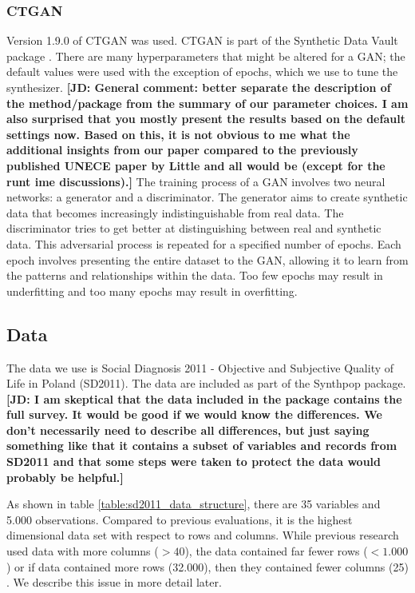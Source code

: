 \documentclass[runningheads]{llncs}
\newcommand{\jd}[1]{\scriptsize {\bf \color{red}[JD: #1]}\normalsize}
\begin{document}
\subsubsection{CTGAN} Version 1.9.0 of CTGAN was used.  CTGAN \cite{ctgan} is part of the Synthetic Data Vault package \cite{patki2016synthetic}.  There are many hyperparameters that might be altered for a GAN; the default values were used with the exception of epochs, which we use to tune the synthesizer. \jd{General comment: better separate the description of the method/package from the summary of our parameter choices. I am also surprised that you mostly present the results based on the default settings now. Based on this, it is not obvious to me what the additional insights from our paper compared to the previously published UNECE paper by Little and all would be (except for the runt ime discussions).} The training process of a GAN involves two neural networks: a generator and a discriminator. The generator aims to create synthetic data that becomes increasingly indistinguishable from real data.  The discriminator tries to get better at distinguishing between real and synthetic data. This adversarial process is repeated for a specified number of epochs.  Each epoch involves presenting the entire dataset to the GAN, allowing it to learn from the patterns and relationships within the data. Too few epochs may result in underfitting and too many epochs may result in overfitting.

\subsection{Data}

The data we use is Social Diagnosis 2011 - Objective and Subjective Quality of Life in Poland (SD2011).  The data are included as part of the Synthpop package.\jd{I am skeptical that the data included in the package contains the full survey. It would be good if we would know the differences. We don't necessarily need to describe all differences, but just saying something like that it contains a subset of variables and records from SD2011 and that some steps were taken to protect the data would probably be helpful.}  

As shown in table \ref{table:sd2011_data_structure}, there are 35 variables and 5.000 observations.  Compared to previous evaluations, it is the highest dimensional data set with respect to rows and columns.  While previous research used data with more columns ($> 40$), the data contained far fewer rows ($< 1.000$) \cite{dankar2021fake} or if data contained more rows (32.000), then they contained fewer columns (25) \cite{little2022comparing}.  We describe this issue in more detail later.
\end{document}
